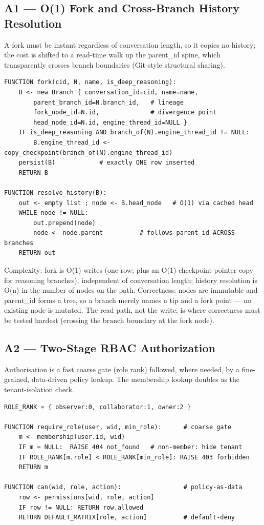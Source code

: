 \documentclass[12pt,a4paper]{report}
\begin{document}
\subsection{A1 --- O(1) Fork and Cross-Branch History Resolution}
A fork must be instant regardless of conversation length, so it copies no history; the cost is shifted to a read-time walk up the parent\_id spine, which transparently crosses branch boundaries (Git-style structural sharing).

\begin{lstlisting}
FUNCTION fork(cid, N, name, is_deep_reasoning):
    B <- new Branch { conversation_id=cid, name=name,
        parent_branch_id=N.branch_id,   # lineage
        fork_node_id=N.id,              # divergence point
        head_node_id=N.id, engine_thread_id=NULL }
    IF is_deep_reasoning AND branch_of(N).engine_thread_id != NULL:
        B.engine_thread_id <- copy_checkpoint(branch_of(N).engine_thread_id)
    persist(B)            # exactly ONE row inserted
    RETURN B

FUNCTION resolve_history(B):
    out <- empty list ; node <- B.head_node   # O(1) via cached head
    WHILE node != NULL:
        out.prepend(node)
        node <- node.parent          # follows parent_id ACROSS branches
    RETURN out
\end{lstlisting}

Complexity: fork is O(1) writes (one row; plus an O(1) checkpoint-pointer copy for reasoning branches), independent of conversation length; history resolution is O(n) in the number of nodes on the path. Correctness: nodes are immutable and parent\_id forms a tree, so a branch merely names a tip and a fork point --- no existing node is mutated. The read path, not the write, is where correctness must be tested hardest (crossing the branch boundary at the fork node).

\subsection{A2 --- Two-Stage RBAC Authorization}
Authorisation is a fast coarse gate (role rank) followed, where needed, by a fine-grained, data-driven policy lookup. The membership lookup doubles as the tenant-isolation check.

\begin{lstlisting}
ROLE_RANK = { observer:0, collaborator:1, owner:2 }

FUNCTION require_role(user, wid, min_role):      # coarse gate
    m <- membership(user.id, wid)
    IF m = NULL:  RAISE 404 not_found   # non-member: hide tenant
    IF ROLE_RANK[m.role] < ROLE_RANK[min_role]: RAISE 403 forbidden
    RETURN m

FUNCTION can(wid, role, action):                 # policy-as-data
    row <- permissions[wid, role, action]
    IF row != NULL: RETURN row.allowed
    RETURN DEFAULT_MATRIX[role, action]          # default-deny
\end{lstlisting}
\end{document}
